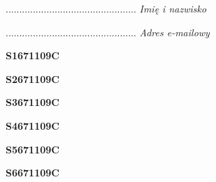 \begin{turn}{90}\begin{minipage}{\linewidth} \vspace{20mm} ................................................  \textit{Imię i nazwisko}\end{minipage}\end{turn}

\begin{turn}{90}\begin{minipage}{\linewidth} \vspace{20mm} ................................................  \textit{Adres e-mailowy}\end{minipage}\end{turn}

\begin{turn}{90}\huge \begin{minipage}{\linewidth} \vspace{10mm}\textbf{S1671109C}\end{minipage}\end{turn}

\begin{turn}{90}\huge \begin{minipage}{\linewidth} \vspace{10mm}\textbf{S2671109C}\end{minipage}\end{turn}

\begin{turn}{90}\huge \begin{minipage}{\linewidth} \vspace{10mm}\textbf{S3671109C}\end{minipage}\end{turn}

\begin{turn}{90}\huge \begin{minipage}{\linewidth} \vspace{10mm}\textbf{S4671109C}\end{minipage}\end{turn}

\begin{turn}{90}\huge \begin{minipage}{\linewidth} \vspace{10mm}\textbf{S5671109C}\end{minipage}\end{turn}

\begin{turn}{90}\huge \begin{minipage}{\linewidth} \vspace{10mm}\textbf{S6671109C}\end{minipage}\end{turn}

